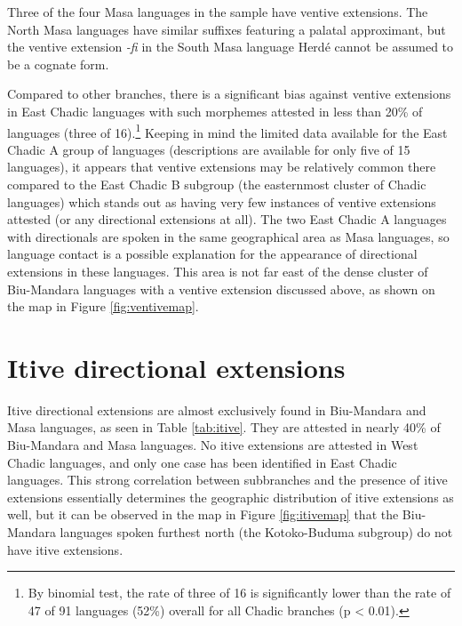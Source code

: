 Three of the four Masa languages in the sample have ventive extensions. The North Masa languages have similar suffixes featuring a palatal approximant, but the ventive extension \textit{-fi} in the South Masa language Herdé cannot be assumed to be a cognate form. 

Compared to other branches, there is a significant bias against ventive extensions in East Chadic languages with such morphemes attested in less than 20\% of languages (three of 16).\footnote{By binomial test, the rate of three of 16 is significantly lower than the rate of 47 of 91 languages (52\%) overall for all Chadic branches (p < 0.01).} Keeping in mind the limited data available for the East Chadic A group of languages (descriptions are available for only five of 15 languages), it appears that ventive extensions may be relatively common there compared to the East Chadic B subgroup (the easternmost cluster of Chadic languages) which stands out as having very few instances of ventive extensions attested (or any directional extensions at all). The two East Chadic A languages with directionals are spoken in the same geographical area as Masa languages, so language contact is a possible explanation for the appearance of directional extensions in these languages. This area is not far east of the dense cluster of Biu-Mandara languages with a ventive extension discussed above, as shown on the map in Figure \ref{fig:ventivemap}. 

\section{Itive directional extensions} \label{sec:itive2}

Itive directional extensions are almost exclusively found in Biu-Mandara and Masa languages, as seen in Table \ref{tab:itive}. They are attested in nearly 40\% of Biu-Mandara and Masa languages. No itive extensions are attested in West Chadic languages, and only one case has been identified in East Chadic languages. This strong correlation between subbranches and the presence of itive extensions essentially determines the geographic distribution of itive extensions as well, but it can be observed in the map in Figure \ref{fig:itivemap} that the Biu-Mandara languages spoken furthest north (the Kotoko-Buduma subgroup) do not have itive extensions.


